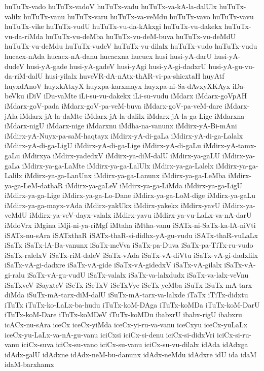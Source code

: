 {huTuTx-vado
huTuTx-vadoV
huTuTx-vadu
huTuTx-va-kA-la-dalUlx
huTuTx-valilx
huTuTx-vanu
huTuTx-varu
huTuTx-va-veMdu
huTuTx-vavo
huTuTx-vavu
huTuTx-vike
huTuTx-vudU
huTuTx-vu-da-kAkxgi
huTuTx-vu-dakekx
huTuTx-vu-da-riMda
huTuTx-vu-deMba
huTuTx-vu-deM-buva
huTuTx-vu-deMdU
huTuTx-vu-deMdu
huTuTx-vudeV
huTuTx-vu-dilalx
huTuTx-vudo
huTuTx-vudu
hucacx-nAda
hucacx-nA-danu
hucacxna
hucucx
husi
husi-yA-darU
husi-yA-dudeV
husi-yA-gade
husi-yA-gadeV
husi-yAgi
husi-yA-gi-dadxrU
husi-yA-gu-vu-da-riM-dalU
husi-yilalx
huveVR-dA-nAtx-thAR-vi-pa-shicxtaH
huyAtf
huyxdAnoV
huyxkAtxyX
huyxpa-karxmayx
huyxpa-ni-Sa-dAvxyXKAyx
iDa-beVku
iDiV
iDu-vaMte
iLi-su-vu-dakekx
iLi-su-vudu
iMdarx
iMdarx-goVpAH
iMdarx-goV-pada
iMdarx-goV-pa-veM-buva
iMdarx-goV-pa-veM-dare
iMdarx-jAla
iMdarx-jA-la-daMte
iMdarx-jA-la-dalilx
iMdarx-jA-la-ga-Lige
iMdarxna
iMdarx-nigU
iMdarx-nige
iMdarxnu
iMdha-na-vanunx
iMdirx-yA-Bi-mAni
iMdirx-yA-Nuyx-pa-saM-haqtayx
iMdirx-yA-di-gaLa
iMdirx-yA-di-ga-Lalalx
iMdirx-yA-di-ga-LigU
iMdirx-yA-di-ga-Lige
iMdirx-yA-di-gaLu
iMdirx-yA-tamx-gaLu
iMdirxya
iMdirx-yadedxV
iMdirx-ya-diM-dalU
iMdirx-ya-gaLU
iMdirx-ya-gaLa
iMdirx-ya-ga-LaMte
iMdirx-ya-ga-LalUlx
iMdirx-ya-ga-Lalelx
iMdirx-ya-ga-Lalilx
iMdirx-ya-ga-LanUnx
iMdirx-ya-ga-Lanunx
iMdirx-ya-ga-LeMba
iMdirx-ya-ga-LeM-dathaR
iMdirx-ya-gaLeV
iMdirx-ya-ga-LiMda
iMdirx-ya-ga-LigU
iMdirx-ya-ga-Lige
iMdirx-ya-ga-Lo-Dane
iMdirx-ya-ga-LoM-dige
iMdirx-ya-gaLu
iMdirx-ya-ga-mayx-vAda
iMdirx-yakUkx
iMdirx-yakekx
iMdirx-yavU
iMdirx-ya-veMdU
iMdirx-ya-veV-dayx-valalx
iMdirx-yavu
iMdirx-ya-vu-LaLx-va-nA-darU
iMdoVrx
iMgina
iMji-ni-ya-riMgf
iMtaha
iMtha-vanu
iSATx-ni-SaTx-ka-lA-niVti
iSATx-nu-sAra
iSATxthaR
iSATx-thaR-si-didhx-yA-gu-vudu
iSATx-thaR-vuLaLx
iSaTx
iSaTx-lA-Ba-vanunx
iSaTx-meVva
iSaTx-pa-Duva
iSaTx-pa-TiTx-ru-vudo
iSaTx-ralelxV
iSaTx-riM-daleV
iSaTx-vAda
iSaTx-vA-diVtu
iSaTx-vA-gi-dadxlilx
iSaTx-vA-gi-dadxre
iSaTx-vA-gide
iSaTx-vA-gidedxV
iSaTx-vA-gilalx
iSaTx-vA-gi-ralu
iSaTx-vA-gu-vudU
iSaTx-valalx
iSaTx-va-lalxdudx
iSaTx-va-lalx-veVnu
iSaTxveV
iSayxteV
iSeTx
iSeTxV
iSeTxVye
iSeTx-yeMba
iSuTx
iSuTx-mA-tarx-diMda
iSuTx-mA-tarx-diM-dalU
iSuTx-mA-tarx-va-lalxde
iTaTx
iTiTx-didxtu
iTuTx
iTuTx-ko-LaLx-ba-hudu
iTuTx-koM-DAga
iTuTx-koMDa
iTuTx-koM-DarU
iTuTx-koM-Dare
iTuTx-koMDeV
iTuTx-koMDu
ibabxrU
ibabx-rigU
ibabxru
icACx-nu-sAra
iceCx
iceCx-yiMda
iceCx-yi-ru-va-vanu
iceCxyu
iceCx-yuLaLx
iceCx-yu-LaLx-va-nA-gu-vanu
iciCxsi
iciCx-si-denu
iciCx-si-didxVri
iciCx-si-ru-vanu
iciCx-suva
iciCx-su-vano
iciCx-su-vanu
iciCx-su-vu-dilalx
idAda
idAdxga
idAdx-galU
idAdxne
idAdx-neM-bu-danunx
idAdx-neMdu
idAdxre
idU
ida
idaM
idaM-barxhamx
}
